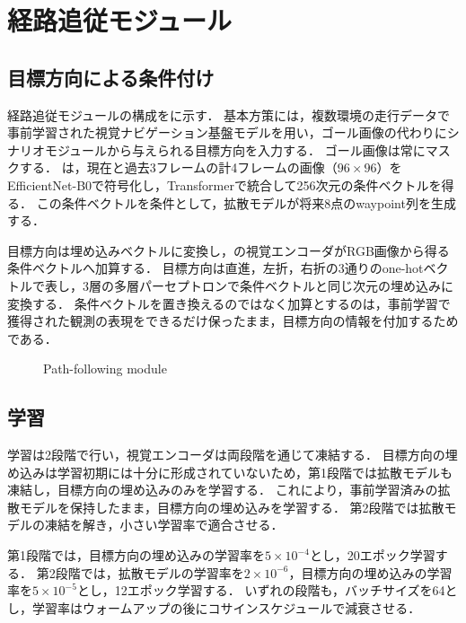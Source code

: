 \section{経路追従モジュール}
\label{sec:path_following}

\subsection{目標方向による条件付け}

経路追従モジュールの構成をに示す．
基本方策には，複数環境の走行データで事前学習された視覚ナビゲーション基盤モデル\NoMaD を用い，ゴール画像の代わりにシナリオモジュールから与えられる目標方向を入力する．
ゴール画像は常にマスクする．
\NoMaD は，現在と過去3フレームの計4フレームの画像（$96\times96$）をEfficientNet-B0\cite{efficientnet}で符号化し，Transformerで統合して256次元の条件ベクトルを得る．
この条件ベクトルを条件として，拡散モデルが将来8点のwaypoint列を生成する．

目標方向は埋め込みベクトルに変換し，\NoMaD の視覚エンコーダがRGB画像から得る条件ベクトルへ加算する．
目標方向は直進，左折，右折の3通りのone-hotベクトルで表し，3層の多層パーセプトロンで条件ベクトルと同じ次元の埋め込みに変換する．
条件ベクトルを置き換えるのではなく加算とするのは，事前学習で獲得された観測の表現をできるだけ保ったまま，目標方向の情報を付加するためである．

\begin{figure}[tb]
  \centering
  \resizebox{\linewidth}{!}{}
  \caption{Path-following module}
  \label{fig:path_following}
\end{figure}

\subsection{学習}

学習は2段階で行い，視覚エンコーダは両段階を通じて凍結する．
目標方向の埋め込みは学習初期には十分に形成されていないため，第1段階では拡散モデルも凍結し，目標方向の埋め込みのみを学習する．
これにより，事前学習済みの拡散モデルを保持したまま，目標方向の埋め込みを学習する．
第2段階では拡散モデルの凍結を解き，小さい学習率で適合させる．

第1段階では，目標方向の埋め込みの学習率を$5\times10^{-4}$とし，20エポック学習する．
第2段階では，拡散モデルの学習率を$2\times10^{-6}$，目標方向の埋め込みの学習率を$5\times10^{-5}$とし，12エポック学習する．
いずれの段階も，バッチサイズを64とし，学習率はウォームアップの後にコサインスケジュールで減衰させる．

